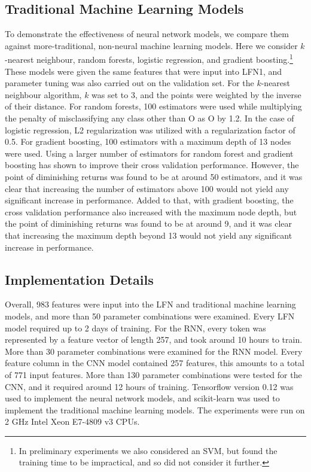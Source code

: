 \documentclass[11pt,a4paper]{article}
\begin{document}
\subsection{Traditional Machine Learning Models}

To demonstrate the effectiveness of neural network models, we compare
them against more-traditional, non-neural machine learning
models. Here we consider $k$-nearest neighbour, random forests,
logistic regression, and gradient boosting.\footnote{In preliminary
  experiments we also considered an SVM, but found the training time
  to be impractical, and so did not consider it further.} These models
were given the same features that were input into LFN1, and parameter
tuning was also carried out on the validation set. For the $k$-nearest
neighbour algorithm, $k$ was set to 3, and the points were weighted by
the inverse of their distance. For random forests, 100 estimators were
used while multiplying the penalty of misclassifying any class other
than {\selectfont O} as {\selectfont
  O} by 1.2. In the case of logistic regression, L2 regularization was
utilized with a regularization factor of 0.5. For gradient boosting,
100 estimators with a maximum depth of 13 nodes were used. Using a
larger number of estimators for random forest and gradient boosting
has shown to improve their cross validation performance. However, the
point of diminishing returns was found to be at around 50 estimators,
and it was clear that increasing the number of estimators above 100
would not yield any significant increase in performance. Added to
that, with gradient boosting, the cross validation performance also
increased with the maximum node depth, but the point of diminishing
returns was found to be at around 9, and it was clear that increasing
the maximum depth beyond 13 would not yield any significant increase
in performance.


\subsection{Implementation Details}


Overall, 983 features were input into the LFN and traditional machine
learning models, and more than 50 parameter combinations were
examined.  Every LFN model required up to 2 days of training.  For
the RNN, every token was represented by a feature vector of length
257, and took around 10 hours to train. More than 30 parameter
combinations were examined for the RNN model. Every feature column in
the CNN model contained 257 features, this amounts to a total of 771
input features. More than 130 parameter combinations were tested for
the CNN, and it required around 12 hours of training.  Tensorflow \cite{tensorflow2015-whitepaper} 
version 0.12 was used to implement
the neural network models, and scikit-learn \cite{scikit-learn} was
used to implement the traditional machine learning models. The experiments were run on 2 GHz Intel Xeon E7-4809 v3 CPUs. 
\end{document}
